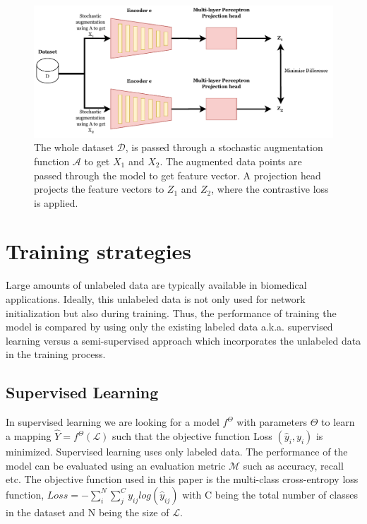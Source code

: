 \begin{figure}[htbp]
\centering
\captionsetup{format=plain}
\includegraphics[keepaspectratio,width=\textwidth]{figures/fig_simclr.pdf}
\caption{The whole dataset $\mathcal{D}$, is passed through a stochastic augmentation function $\mathcal{A}$ to get $X_1$ and $X_2$. The augmented data points are passed through the model to get feature vector. A projection head projects the feature vectors to $Z_1$ and $Z_2$, where the contrastive loss is applied.}
\label{fig:simclr}
\end{figure}


\section{Training strategies}\label{section:training_strategies}
Large amounts of unlabeled data are typically available in biomedical applications. Ideally, this unlabeled data is not only used for network initialization but also during training. Thus, the performance of training the model is compared by using only the existing labeled data a.k.a. supervised learning versus a semi-supervised approach which incorporates the unlabeled data in the training process.

\subsection{Supervised Learning}
In supervised learning we are looking for a model $f^\Theta$ with parameters $\Theta$ to learn a mapping $\hat{Y} = f^\Theta(\mathcal{L})$ such that the objective function Loss $(\hat{y}_i, y_i)$ is minimized. Supervised learning uses only labeled data. The performance of the model can be evaluated using an evaluation metric $\mathcal{M}$ such as accuracy, recall etc. The objective function used in this paper is the multi-class cross-entropy loss function, $Loss = - \sum_{i}^{N} \sum_{j}^{C} y_{ij}log(\hat{y}_{ij})$ with C being the total number of classes in the dataset and N being the size of $\mathcal{L}$.


